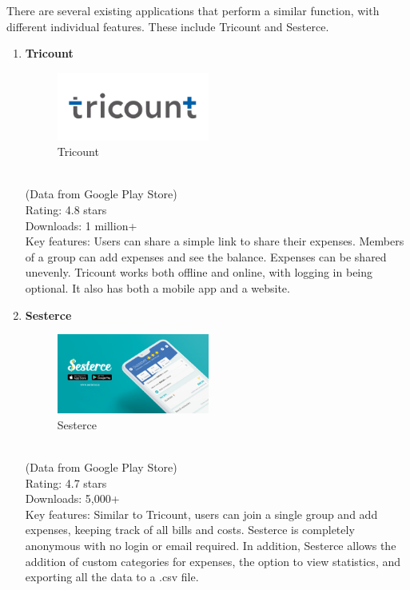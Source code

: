 \documentclass[conference]{IEEEtran}
\begin{document}
There are several existing applications that perform a similar function, with different individual features. These include Tricount and Sesterce.
\begin{enumerate}
    \item \textbf{Tricount}
        \begin{figure}[htbp]
            \centerline{\includegraphics[width=50mm,scale=0.5]{img/logo-tricount.png}}
            \caption{Tricount}
            \label{fig:my_label}
        \end{figure}
        \\
        (Data from Google Play Store) \\
        Rating: 4.8 stars \\
        Downloads: 1 million+ \\
        Key features: Users can share a simple link to share their expenses. Members of a group can add expenses and see the balance. Expenses can be shared unevenly. Tricount works both offline and online, with logging in being optional. It also has both a mobile app and a website.
    \item \textbf{Sesterce}
        \begin{figure}[htbp]
            \centerline{\includegraphics[width=50mm,scale=0.5]{img/logo-sesterce.png}}
            \caption{Sesterce}
            \label{fig:my_label}
        \end{figure}
        \\
        (Data from Google Play Store) \\
        Rating: 4.7 stars \\
        Downloads: 5,000+ \\
        Key features: Similar to Tricount, users can join a single group and add expenses, keeping track of all bills and costs. Sesterce is completely anonymous with no login or email required. In addition, Sesterce allows the addition of custom categories for expenses, the option to view statistics, and exporting all the data to a .csv file.
\end{enumerate}
\end{document}
